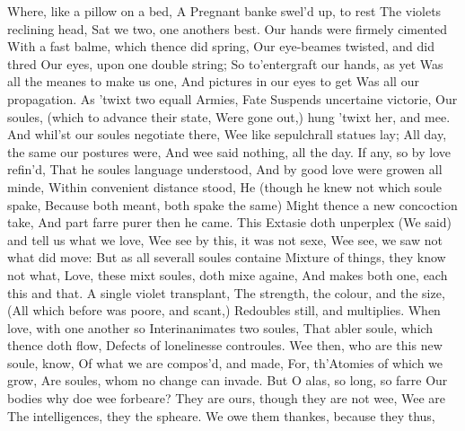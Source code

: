 \documentclass{book}
\newenvironment{poem}[1]%
  {\poemtitle{#1}%
   \Versus
   \numerus{1}%
  }
  {\endVersus}
\begin{document}
    
\begin{poem}{The Extasie} %
\Forma {}
      
  Where, like a pillow on a bed,        
    A Pregnant banke swel'd up, to rest \auto       
  The violets reclining head,        
    Sat we two, one anothers best.        
  Our hands were firmely cimented       
    With a fast balme, which thence did spring,        
  Our eye-beames twisted, and did thred        
    Our eyes, upon one double string;        
  So to'entergraft our hands, as yet        
    Was all the meanes to make us one,       
  And pictures in our eyes to get        
    Was all our propagation.        
  As 'twixt two equall Armies, Fate        
    Suspends uncertaine victorie,        
  Our soules, (which to advance their state,       
    Were gone out,) hung 'twixt her, and mee.        
  And whil'st our soules negotiate there,        
    Wee like sepulchrall statues lay;        
  All day, the same our postures were,        
    And wee said nothing, all the day.       
  If any, so by love refin'd,        
    That he soules language understood,        
  And by good love were growen all minde,        
    Within convenient distance stood,        
  He (though he knew not which soule spake,       
    Because both meant, both spake the same)        
  Might thence a new concoction take,        
    And part farre purer then he came.        
  This Extasie doth unperplex        
    (We said) and tell us what we love,       
  Wee see by this, it was not sexe,        
    Wee see, we saw not what did move:        
  But as all severall soules containe        
    Mixture of things, they know not what,        
  Love, these mixt soules, doth mixe againe,       
    And makes both one, each this and that.        
  A single violet transplant,        
    The strength, the colour, and the size,        
  (All which before was poore, and scant,)        
    Redoubles still, and multiplies.       
  When love, with one another so        
    Interinanimates two soules,        
  That abler soule, which thence doth flow,        
    Defects of lonelinesse controules.        
  Wee then, who are this new soule, know,       
    Of what we are compos'd, and made,        
  For, th'Atomies of which we grow,        
    Are soules, whom no change can invade.        
  But O alas, so long, so farre        
    Our bodies why doe wee forbeare?       
  They are ours, though they are not wee, Wee are        
    The intelligences, they the spheare.        
  We owe them thankes, because they thus,        

\end{poem}
\end{document}
